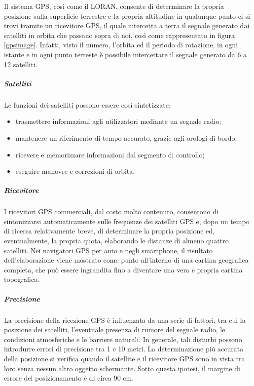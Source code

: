 Il sistema GPS, così come il LORAN, consente di determinare la propria posizione sulla superficie terrestre e la propria altitudine in qualunque punto ci si trovi tramite un ricevitore GPS, il quale intercetta a terra il segnale generato dai satelliti in orbita che passano sopra di noi, così come rappresentato in figura \ref{gpsimage}.
Infatti, visto il numero, l'orbita ed il periodo di rotazione, in ogni istante e in ogni punto terreste è possibile intercettare il segnale generato da 6 a 12 satelliti.

\subparagraph{Satelliti}
Le funzioni dei satelliti possono essere così sintetizzate:
\begin{itemize}
\item trasmettere informazioni agli utilizzatori mediante un segnale radio;
\item mantenere un riferimento di tempo accurato, grazie agli orologi di bordo;
\item ricevere e memorizzare informazioni dal segmento di controllo;
\item eseguire manovre e correzioni di orbita.
\end{itemize}

\subparagraph{Ricevitore}
I ricevitori GPS commerciali, dal costo molto contenuto, consentono di sintonizzarsi automaticamente sulle frequenze dei satelliti GPS e, dopo un tempo di ricerca relativamente breve, di determinare la propria posizione ed, eventualmente, la propria quota, elaborando le distanze di almeno quattro satelliti.
Nei navigatori GPS per auto e negli smartphone, il risultato dell'elaborazione viene mostrato come punto all'interno di una cartina geografica completa, che può essere ingrandita fino a diventare una vera e propria cartina topografica.

\subparagraph{Precisione}
La precisione della ricezione GPS è influenzata da una serie di fattori, tra cui la posizione dei satelliti, l'eventuale presenza di rumore del segnale radio, le condizioni atmosferiche e le barriere naturali.
In generale, tali disturbi possono introdurre errori di precisione tra 1 e 10 metri.
La determinazione  più accurata della  posizione si verifica quando il satellite e il ricevitore GPS sono in vista tra loro senza  nessun altro oggetto schermante. Sotto questa ipotesi, il margine di errore del posizionamento è di circa 90 cm.

